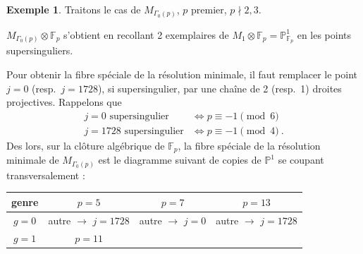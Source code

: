 \documentclass[10pt,a4paper]{amsart}
\theoremstyle{plain}
\theoremstyle{definition}
\newtheorem{example}[theorem]{Exemple}
\newcommand{\FF}{\mathbb{F}}
\begin{document}
\begin{example}
Traitons le cas de $M_{\Gamma_0(p)}$, $p$ premier, $p \nmid 2, 3$.

$M_{\Gamma_0(p)} \otimes \FF_p$ s'obtient en recollant 2 exemplaires de $M_1 \otimes \FF_p = \mathbb{P}^1_{\FF_p}$ en les points supersinguliers.

Pour obtenir la fibre sp\'eciale de la r\'esolution minimale, il faut remplacer le point $j = 0$ (resp.\ $j = 1728$), si supersingulier, par une cha\^ine de 2 (resp.\ 1) droites projectives. Rappelons que
\begin{align*}
j = 0 \text{ supersingulier} &\iff p \equiv -1 \pmod 6\\
j = 1728 \text{ supersingulier} &\iff p \equiv -1 \pmod 4\ .
\end{align*}
Des lors, sur la cl\^oture alg\'ebrique de $\FF_p$, la fibre sp\'eciale de la r\'esolution minimale de $M_{\Gamma_0(p)}$ est le diagramme suivant de copies de $\mathbb{P}^1$ se coupant transversalement :

\begin{center}
\begin{tabular}{c|c|c|c}
genre & $p = 5$ & $p = 7$ & $p = 13$\\
\hline
$g = 0$ & autre $\to$ $j = 1728$ & autre $\to$ $j = 0$ & autre $\to$ $j = 1728$\\
\hline
$g = 1$ & $p = 11$ &
\end{tabular}
\end{center}
\end{example}
\end{document}
